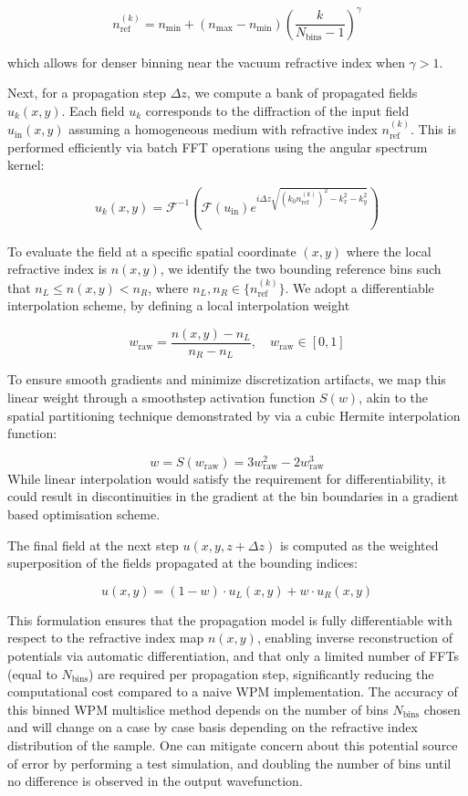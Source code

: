 \documentclass{article}
\begin{document}
\[
n_{\mathrm{ref}}^{(k)} = n_{\mathrm{min}} + (n_{\mathrm{max}} - n_{\mathrm{min}}) \left( \frac{k}{N_{\mathrm{bins}}-1} \right)^\gamma
\]

which allows for denser binning near the vacuum refractive index when $\gamma > 1$.

Next, for a propagation step $\Delta z$, we compute a bank of propagated fields $u_k(x,y)$. Each field $u_k$ corresponds to the 
diffraction of the input field $u_{\mathrm{in}}(x,y)$ assuming a homogeneous medium with refractive index $n_{\mathrm{ref}}^{(k)}$. 
This is performed efficiently via batch FFT operations using the angular spectrum kernel:

\[
u_k(x,y) = \mathcal{F}^{-1} \left( \mathcal{F}(u_{\mathrm{in}}) e^{i \Delta z \sqrt{(k_0 n_{\mathrm{ref}}^{(k)})^2 - k_x^2 - k_y^2}} \right)
\]

To evaluate the field at a specific spatial coordinate $(x,y)$ where the local refractive index is $n(x,y)$, 
we identify the two bounding reference bins such that $n_L \le n(x,y) < n_R$, where $n_L, n_R \in \{n_{\mathrm{ref}}^{(k)}\}$. 
We adopt a differentiable interpolation scheme, by defining a local interpolation weight 

\[
w_{\mathrm{raw}} = \frac{n(x,y) - n_L}{n_R - n_L}, \quad w_{\mathrm{raw}} \in [0, 1]
\]

To ensure smooth gradients and minimize discretization artifacts, we map this linear weight through a smoothstep activation function $S(w)$, 
akin to the spatial partitioning technique demonstrated by \cite{Barré and Brunel} via a cubic Hermite interpolation function:

\[
w = S(w_{\mathrm{raw}}) = 3w_{\mathrm{raw}}^2 - 2w_{\mathrm{raw}}^3
\]
While linear interpolation would satisfy the requirement for differentiability, it could result in discontinuities in the gradient at the bin boundaries in a gradient based optimisation scheme.

The final field at the next step $u(x,y, z+\Delta z)$ is computed as the weighted superposition of the fields 
propagated at the bounding indices: 

\[
u(x,y) = (1 - w) \cdot u_L(x,y) + w \cdot u_R(x,y)
\]

This formulation ensures that the propagation model is fully differentiable with respect to the refractive index map $n(x,y)$, enabling inverse reconstruction of potentials via automatic differentiation,
and that only a limited number of FFTs (equal to $N_{\mathrm{bins}}$) are required per propagation step, significantly reducing the computational cost compared to a naive WPM implementation. 
The accuracy of this binned WPM multislice method depends on the number of bins $N_{\mathrm{bins}}$ chosen and will change on a case by case basis depending on the refractive index distribution of the sample. 
One can mitigate concern about this potential source of error by performing a test simulation, and doubling the number of bins until no difference is observed in the output wavefunction. 
\end{document}
